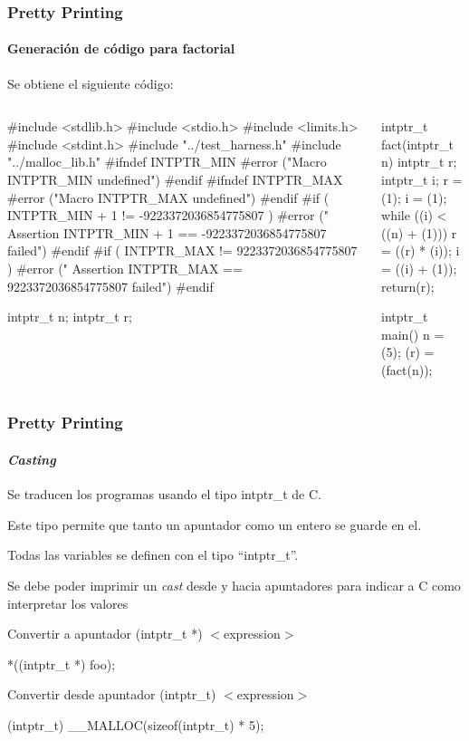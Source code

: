 \begin{frame}[fragile]
\frametitle{Pretty Printing}
\framesubtitle{Generación de código para factorial}
\Fontvi

Se obtiene el siguiente código:

\begin{columns}[t]
\begin{semiverbatim}
\alert<2>{#include <stdlib.h>}
\alert<2>{#include <stdio.h>}
\alert<2>{#include <limits.h>}
\alert<2>{#include <stdint.h>}
\alert<2>{#include "../test_harness.h"}
\alert<2>{#include "../malloc_lib.h"}
\alert<3>{#ifndef INTPTR_MIN}
  \alert<3>{#error ("Macro INTPTR_MIN undefined")}
\alert<3>{#endif}
\alert<3>{#ifndef INTPTR_MAX}
  \alert<3>{#error ("Macro INTPTR_MAX undefined")}
\alert<3>{#endif}
\alert<3>{#if ( INTPTR_MIN + 1 != -9223372036854775807 )}
  \alert<3>{#error (" Assertion INTPTR_MIN + 1 == -9223372036854775807 failed")}
\alert<3>{#endif}
\alert<3>{#if ( INTPTR_MAX != 9223372036854775807 )}
  \alert<3>{#error (" Assertion INTPTR_MAX == 9223372036854775807 failed")}
\alert<3>{#endif}


intptr_t n;
intptr_t r;
\end{semiverbatim}
\begin{semiverbatim}
intptr_t fact(intptr_t n) {
  intptr_t r;
  intptr_t i;
  r = (1);
  i = (1);
  while ((i) < ((n) + (1))) {
    r = ((r) * (i));
    i = ((i) + (1));
  }
  return(r);
}

intptr_t main() {
  n = (5);
  (r) = (fact(n));
}
\end{semiverbatim}
\end{columns}


\end{frame}


\begin{frame}
\frametitle{Pretty Printing}
\framesubtitle{\textit{Casting}}

Se traducen los programas usando el tipo intptr\_t de C.
\bigskip

Este tipo permite que tanto un apuntador como un entero se guarde en el.

Todas las variables se definen con el tipo ``intptr\_t''.

\bigskip

Se debe poder imprimir un \textit{cast} desde y hacia apuntadores para indicar a C como interpretar los valores

\bigskip
\pause

\begin{block}{Convertir a apuntador}
(intptr\_t *) $<$expression$>$

*((intptr\_t *) foo);
\end{block}

\begin{block}{Convertir desde apuntador}
(intptr\_t) $<$expression$>$

(intptr\_t) \_\_MALLOC(sizeof(intptr\_t) * 5);
\end{block}


\end{frame}



